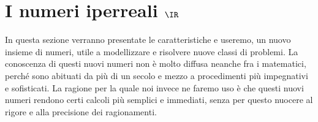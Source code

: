 


\section{I numeri iperreali $\IR$}
\label{sec:insnum_iperreali}

In questa sezione verranno presentate le caratteristiche e useremo, un 
nuovo insieme di numeri, utile a modellizzare e risolvere nuove classi di 
problemi. 
La conoscenza di questi nuovi numeri non è molto diffusa neanche fra i 
matematici, perché sono abituati da più di un secolo e mezzo a procedimenti 
più impegnativi e sofisticati.
La ragione per la quale noi invece ne faremo uso è che questi nuovi numeri 
rendono certi calcoli più semplici e immediati, senza per questo nuocere al 
rigore e alla precisione dei ragionamenti.

% 
% 

